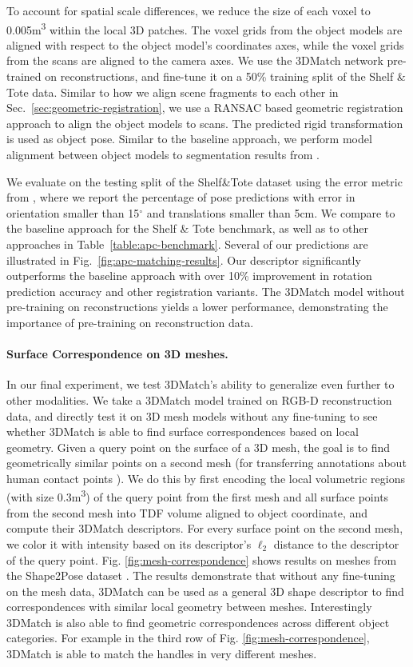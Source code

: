 \documentclass[10pt,twocolumn,letterpaper]{article}
\newcommand{\mypara}{\vspace*{-3mm}\paragraph}
\begin{document}
To account for spatial scale differences, we reduce the size of each voxel to 0.005m\textsuperscript{3} within the local 3D patches. The voxel grids from the object models are aligned with respect to the object model's coordinates axes, while the voxel grids from the scans are aligned to the camera axes. We use the 3DMatch network pre-trained on reconstructions, and fine-tune it on a 50\% training split of the Shelf \& Tote data. Similar to how we align scene fragments to each other in Sec.~\ref{sec:geometric-registration}, we use a RANSAC based geometric registration approach to align the object models to scans. The predicted rigid transformation is used as object pose. Similar to the baseline approach, we perform model alignment between object models to segmentation results from \cite{zeng2016multi}.


We evaluate on the testing split of the Shelf\&Tote dataset using the error metric from \cite{zeng2016multi}, where we report the percentage of pose predictions with error in orientation smaller than 15$^{\circ}$ and translations smaller than 5cm. We compare to the baseline approach for the Shelf \& Tote benchmark, as well as to other approaches in Table~\ref{table:apc-benchmark}. Several of our predictions are illustrated in Fig.~\ref{fig:apc-matching-results}. Our descriptor significantly outperforms the baseline approach with over 10\% improvement in rotation prediction accuracy and other registration variants. The 3DMatch model without pre-training on reconstructions yields a lower performance, demonstrating the importance of pre-training on reconstruction data. 




\mypara{Surface Correspondence on 3D meshes.}
In our final experiment, we test 3DMatch's ability to generalize even further to other modalities. We take a 3DMatch model trained on RGB-D reconstruction data, and directly test it on 3D mesh models without any fine-tuning to see whether 3DMatch is able to find surface correspondences based on local geometry. Given a query point on the surface of a 3D mesh, the goal is to find geometrically similar points on a second mesh (\eg for transferring annotations about human contact points \cite{kim2014shape2pose}). We do this by first encoding the local volumetric regions (with size 0.3m\textsuperscript{3}) of the query point from the first mesh and all surface points from the second mesh into TDF volume aligned to object coordinate, and compute their 3DMatch descriptors. For every surface point on the second mesh, we color it with intensity based on its descriptor's $\ell_2$ distance to the descriptor of the query point. Fig. \ref{fig:mesh-correspondence} shows results on meshes from the Shape2Pose dataset \cite{kim2014shape2pose}. 
The results demonstrate that without any fine-tuning on the mesh data, 3DMatch can be used as a general 3D shape descriptor to find correspondences with similar local geometry between meshes.
Interestingly 3DMatch is also able to find geometric correspondences across different object categories. For example in the third row of Fig. \ref{fig:mesh-correspondence}, 3DMatch is able to match the handles in very different meshes.
\end{document}
